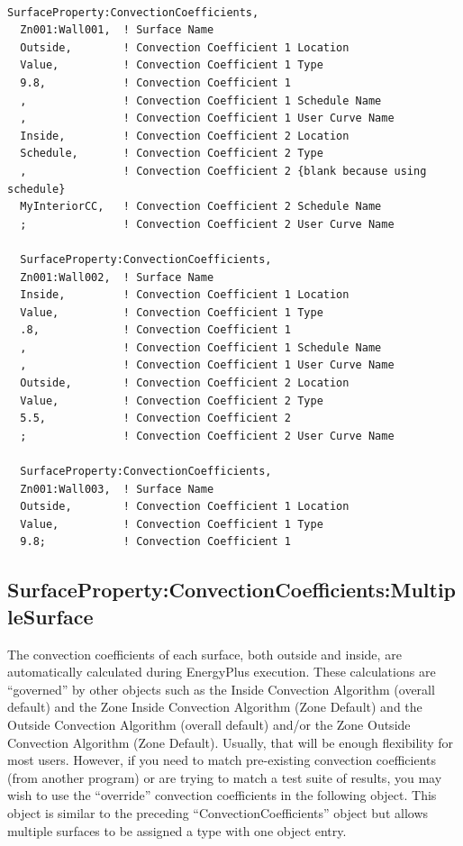 \begin{lstlisting}

SurfaceProperty:ConvectionCoefficients,
  Zn001:Wall001,  ! Surface Name
  Outside,        ! Convection Coefficient 1 Location
  Value,          ! Convection Coefficient 1 Type
  9.8,            ! Convection Coefficient 1
  ,               ! Convection Coefficient 1 Schedule Name
  ,               ! Convection Coefficient 1 User Curve Name
  Inside,         ! Convection Coefficient 2 Location
  Schedule,       ! Convection Coefficient 2 Type
  ,               ! Convection Coefficient 2 {blank because using schedule}
  MyInteriorCC,   ! Convection Coefficient 2 Schedule Name
  ;               ! Convection Coefficient 2 User Curve Name

  SurfaceProperty:ConvectionCoefficients,
  Zn001:Wall002,  ! Surface Name
  Inside,         ! Convection Coefficient 1 Location
  Value,          ! Convection Coefficient 1 Type
  .8,             ! Convection Coefficient 1
  ,               ! Convection Coefficient 1 Schedule Name
  ,               ! Convection Coefficient 1 User Curve Name
  Outside,        ! Convection Coefficient 2 Location
  Value,          ! Convection Coefficient 2 Type
  5.5,            ! Convection Coefficient 2
  ;               ! Convection Coefficient 2 User Curve Name

  SurfaceProperty:ConvectionCoefficients,
  Zn001:Wall003,  ! Surface Name
  Outside,        ! Convection Coefficient 1 Location
  Value,          ! Convection Coefficient 1 Type
  9.8;            ! Convection Coefficient 1
\end{lstlisting}

\subsection{SurfaceProperty:ConvectionCoefficients:MultipleSurface}\label{surfacepropertyconvectioncoefficientsmultiplesurface}

The convection coefficients of each surface, both outside and inside, are automatically calculated during EnergyPlus execution. These calculations are ``governed'' by other objects such as the Inside Convection Algorithm (overall default) and the Zone Inside Convection Algorithm (Zone Default) and the Outside Convection Algorithm (overall default) and/or the Zone Outside Convection Algorithm (Zone Default). Usually, that will be enough flexibility for most users. However, if you need to match pre-existing convection coefficients (from another program) or are trying to match a test suite of results, you may wish to use the ``override'' convection coefficients in the following object. This object is similar to the preceding ``ConvectionCoefficients'' object but allows multiple surfaces to be assigned a type with one object entry.

